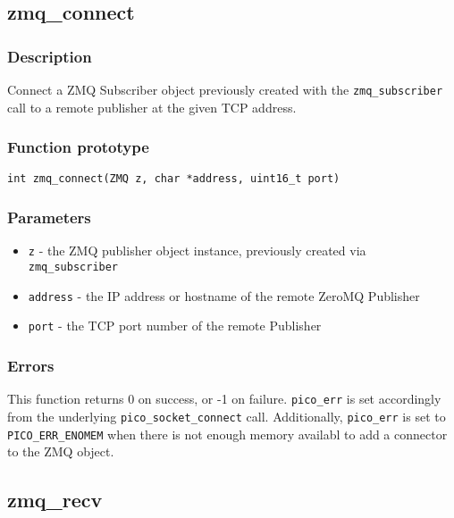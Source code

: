 
\subsection{zmq\_connect}
\subsubsection*{Description}
Connect a ZMQ Subscriber object previously created with the \texttt{zmq\_subscriber} call to a remote publisher at the given TCP address.

\subsubsection*{Function prototype}
\begin{verbatim}
int zmq_connect(ZMQ z, char *address, uint16_t port)
\end{verbatim}

\subsubsection*{Parameters}
\begin{itemize}[noitemsep]
\item \texttt{z} - the ZMQ publisher object instance, previously created via \texttt{zmq\_subscriber} 
\item \texttt{address} - the IP address or hostname of the remote ZeroMQ Publisher 
\item \texttt{port} - the TCP port number of the remote Publisher
\end{itemize}

\subsubsection*{Errors}
This function returns 0 on success, or -1 on failure. \texttt{pico\_err} is set accordingly from the underlying \texttt{pico\_socket\_connect} call. Additionally, \texttt{pico\_err} is set to \texttt{PICO\_ERR\_ENOMEM} when there is not enough memory availabl to add a connector to the ZMQ object.

\subsection{zmq\_recv}
